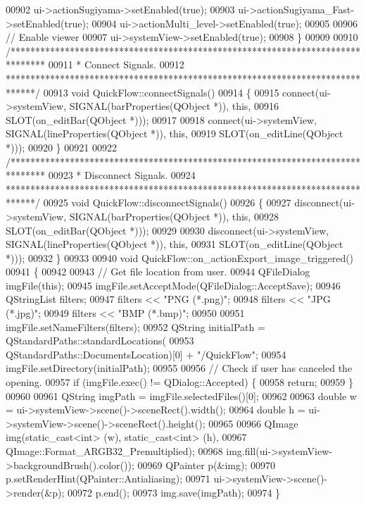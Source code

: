 \begin{DoxyCode}
00902   ui->actionSugiyama->setEnabled(\textcolor{keyword}{true});
00903   ui->actionSugiyama\_Fast->setEnabled(\textcolor{keyword}{true});
00904   ui->actionMulti\_level->setEnabled(\textcolor{keyword}{true});
00905 
00906   \textcolor{comment}{// Enable viewer}
00907   ui->systemView->setEnabled(\textcolor{keyword}{true});
00908 \}
00909 
00910 \textcolor{comment}{/*******************************************************************************}
00911 \textcolor{comment}{ * Connect Signals.}
00912 \textcolor{comment}{ ******************************************************************************/}
00913 \textcolor{keywordtype}{void} QuickFlow::connectSignals()
00914 \{
00915   connect(ui->systemView, SIGNAL(barProperties(QObject *)), \textcolor{keyword}{this},
00916           SLOT(on\_editBar(QObject *)));
00917 
00918   connect(ui->systemView, SIGNAL(lineProperties(QObject *)), \textcolor{keyword}{this},
00919           SLOT(on\_editLine(QObject *)));
00920 \}
00921 
00922 \textcolor{comment}{/*******************************************************************************}
00923 \textcolor{comment}{ * Disconnect Signals.}
00924 \textcolor{comment}{ ******************************************************************************/}
00925 \textcolor{keywordtype}{void} QuickFlow::disconnectSignals()
00926 \{
00927   disconnect(ui->systemView, SIGNAL(barProperties(QObject *)), \textcolor{keyword}{this},
00928              SLOT(on\_editBar(QObject *)));
00929 
00930   disconnect(ui->systemView, SIGNAL(lineProperties(QObject *)), \textcolor{keyword}{this},
00931              SLOT(on\_editLine(QObject *)));
00932 \}
00933 
00940 \textcolor{keywordtype}{void} QuickFlow::on\_actionExport\_image\_triggered()
00941 \{
00942 
00943   \textcolor{comment}{// Get file location from user.}
00944   QFileDialog imgFile(\textcolor{keyword}{this});
00945   imgFile.setAcceptMode(QFileDialog::AcceptSave);
00946   QStringList filters;
00947   filters << \textcolor{stringliteral}{"PNG (*.png)"};
00948   filters << \textcolor{stringliteral}{"JPG (*.jpg)"};
00949   filters << \textcolor{stringliteral}{"BMP (*.bmp)"};
00950 
00951   imgFile.setNameFilters(filters);
00952   QString initialPath = QStandardPaths::standardLocations(
00953                           QStandardPaths::DocumentsLocation)[0] + \textcolor{stringliteral}{"/QuickFlow"};
00954   imgFile.setDirectory(initialPath);
00955 
00956   \textcolor{comment}{// Check if user has canceled the opening.}
00957   \textcolor{keywordflow}{if} (imgFile.exec() != QDialog::Accepted) \{
00958     \textcolor{keywordflow}{return};
00959   \}
00960 
00961   QString imgPath =  imgFile.selectedFiles()[0];
00962 
00963   \textcolor{keywordtype}{double} w = ui->systemView->scene()->sceneRect().width();
00964   \textcolor{keywordtype}{double} h = ui->systemView->scene()->sceneRect().height();
00965 
00966   QImage img(static\_cast<int> (w), static\_cast<int> (h),
00967              QImage::Format\_ARGB32\_Premultiplied);
00968   img.fill(ui->systemView->backgroundBrush().color());
00969   QPainter p(&img);
00970   p.setRenderHint(QPainter::Antialiasing);
00971   ui->systemView->scene()->render(&p);
00972   p.end();
00973   img.save(imgPath);
00974 \}
\end{DoxyCode}
